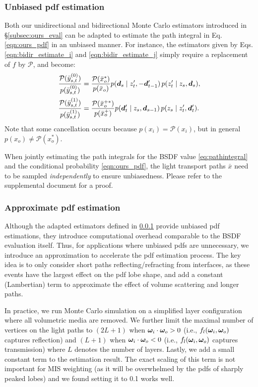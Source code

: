 \subsubsection{Unbiased pdf estimation}
\label{sssec:ours_pdf_unbiased}

Both our unidirectional and bidirectional Monte Carlo estimators introduced in \S\ref{subsec:ours_eval} can be adapted to estimate the path integral in Eq. \eqref{eqn:ours_pdf} in an unbiased manner.
For instance, the estimators given by Eqs. \eqref{eqn:bidir_estimate_i} and \eqref{eqn:bidir_estimate_j} simply require a replacement of $f$ by $\mathcal P$, and become:
\begin{align}
	\label{eqn:bidir_pdf_i}
	\frac{\mathcal{P}(\bar{y}^{(0)}_{s, t})}{p(\bar{y}^{(0)}_{s, t})} &= \frac{\mathcal{P}(\bar{x}_o^*)}{p(\bar{x}_o)}
	 p( \bm{d}_s \;|\; z'_t, -\bm{d}'_{t - 1}) \, p(z'_t \;|\; z_s, \bm{d}_s),\\
	\label{eqn:bidir_pdf_j}
	\frac{\mathcal{P}(\bar{y}^{(1)}_{s, t})}{p(\bar{y}^{(1)}_{s, t})} &= \frac{\mathcal{P}(\bar{x}_o^{+*})}{p(\bar{x}_o^+)}
	 p( \bm{d}'_t \;|\; z_s, \bm{d}_{s - 1}) \, p(z_s \;|\; z'_t, \bm{d}'_t ).
\end{align}
Note that some cancellation occurs because $p(x_i) = \mathcal P(x_i)$, but in general $p(x_o) \neq \mathcal P(x_o^*)$.

When jointly estimating the path integrals for the BSDF value \eqref{eq:pathintegral} and the conditional probability \eqref{eqn:ours_pdf}, the light transport paths $\bar{x}$ need to be sampled \emph{independently} to ensure unbiasedness.
Please refer to the supplemental document for a proof.

\subsubsection{Approximate pdf estimation}
\label{sssec:ours_pdf_approx}
%
Although the adapted estimators defined in \ref{sssec:ours_pdf_unbiased} provide unbiased pdf estimations, they introduce computational overhead comparable to the BSDF evaluation itself.
Thus, for applications where unbiased pdfs are unnecessary, we introduce an approximation to accelerate the pdf estimation process. The key idea is to only consider short paths reflecting/refracting from interfaces, as these events have the largest effect on the pdf lobe shape, and add a constant (Lambertian) term to approximate the effect of volume scattering and longer paths.

In practice, we run Monte Carlo simulation on a simplified layer configuration where all volumetric media are removed.
We further limit the maximal number of vertices on the light paths to $(2L + 1)$ when $\bm{\omega}_i \cdot \bm{\omega}_o > 0$ (i.e., $f_l(\bm{\omega}_i, \bm{\omega}_o)$ captures reflection) and $(L + 1)$ when $\bm{\omega}_i \cdot \bm{\omega}_o < 0$ (i.e., $f_l(\bm{\omega}_i, \bm{\omega}_o)$ captures transmission) where $L$ denotes the number of layers.
Lastly, we add a small constant term to the estimation result. The exact scaling of this term is not important for MIS weighting (as it will be overwhelmed by the pdfs of sharply peaked lobes) and we found setting it to 0.1 works well.

